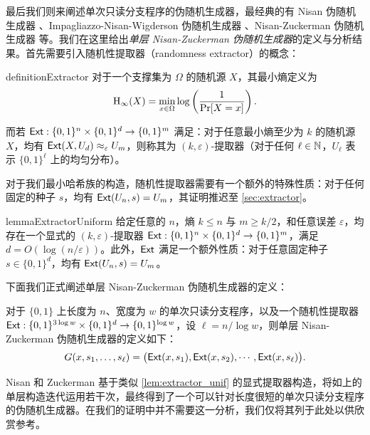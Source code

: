 最后我们则来阐述单次只读分支程序的伪随机生成器，最经典的有 Nisan 伪随机生成器 \cite{Nisan90_PRG}、Impagliazzo-Nisan-Wigderson 伪随机生成器 \cite{INW94_PRG}、Nisan-Zuckerman 伪随机生成器 \cite{NZ96_Nisan_Zuckerman_PRG} 等。我们在这里给出\emph{单层 Nisan-Zuckerman 伪随机生成器}的定义与分析结果。首先需要引入随机性提取器（randomness extractor）的概念：

\begin{restatable}{definition}{Extractor}\label{def:extractor}
    对于一个支撑集为 $\Omega$ 的随机源 $X$，其最小熵定义为
    $$
    \mathrm{H}_\infty(X) = \min_{x \in \Omega} \log \left( \frac{1}{\Pr[X = x]} \right).
    $$

    而若 $\mathsf{Ext} : \{0, 1\}^n \times \{0, 1\}^d \to \{0, 1\}^m$ 满足：对于任意最小熵至少为 $k$ 的随机源 $X$，均有 $\mathsf{Ext}(X, U_d) \approx_{\varepsilon} U_m$，则称其为 $(k,\varepsilon)$-提取器（对于任何 $\ell \in \mathbb{N}$，$U_\ell$ 表示 $\{0, 1\}^\ell$ 上的均匀分布）。
\end{restatable}

对于我们最小哈希族的构造，随机性提取器需要有一个额外的特殊性质：对于任何固定的种子 $s$，均有 $\mathsf{Ext}(U_n, s) = U_m$，其证明推迟至 \ref{sec:extractor}。

\begin{restatable}{lemma}{ExtractorUniform}\label{lem:extractor_unif}
    给定任意的 $n$，熵 $k \le n$ 与 $m \ge k / 2$，和任意误差 $\varepsilon$，均存在一个显式的 $(k, \varepsilon)$-提取器 $\mathsf{Ext} : \{0, 1\}^n \times \{0, 1\}^d \to \{0, 1\}^m$，满足 $d = O(\log (n / \varepsilon))$。此外，$\mathsf{Ext}$ 满足一个额外性质：对于任意固定种子 $s \in \{0, 1\}^d$，均有 $\mathsf{Ext}(U_n, s) = U_m$。 
\end{restatable}

下面我们正式阐述单层 Nisan-Zuckerman 伪随机生成器的定义：

\begin{definition}\label{def:NZ_PRG}
    对于 $\{0, 1\}$ 上长度为 $n$、宽度为 $w$ 的单次只读分支程序，以及一个随机性提取器 $\mathsf{Ext} : \{0, 1\}^{3 \log w} \times \{0, 1\}^d \to \{0, 1\}^{\log w}$，设 $\ell = n / \log w$，则单层 Nisan-Zuckerman 伪随机生成器的定义如下：
    $$
    G(x, s_1, \ldots, s_\ell) = \big(\mathsf{Ext}(x, s_1), \mathsf{Ext}(x, s_2), \cdots, \mathsf{Ext}(x, s_\ell)\big).
    $$
\end{definition}

Nisan 和 Zuckerman 基于类似 \cref{lem:extractor_unif} 的显式提取器构造，将如上的单层构造迭代运用若干次，最终得到了一个可以针对长度很短的单次只读分支程序的伪随机生成器。在我们的证明中并不需要这一分析，我们仅将其列于此处以供欣赏参考。

